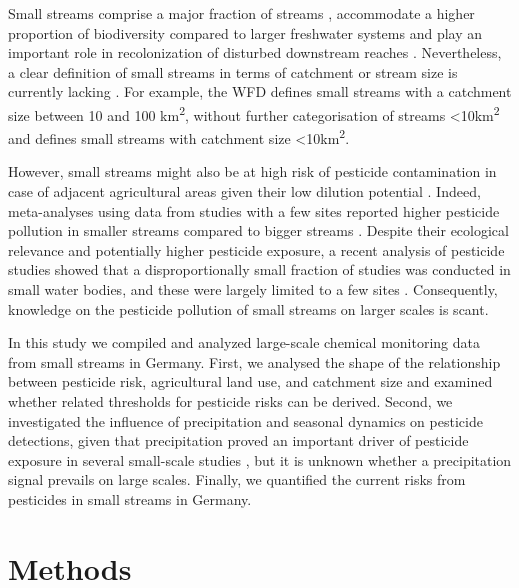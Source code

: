 \documentclass[journal=esthag,manuscript=article]{achemso}
\begin{document}
Small streams comprise a major fraction of streams \citep{nadeau_hydrological_2007}, accommodate a higher proportion of biodiversity compared to larger freshwater systems \citep{davies_comparison_2008, biggs_report_2014} and play an important role in recolonization of disturbed downstream reaches \citep{liess_analyzing_2005, orlinskiy_forested_2015}.
Nevertheless, a clear definition of small streams in terms of catchment or stream size is currently lacking \citep{lorenz_specifics_2016}. 
For example, the WFD defines small streams with a catchment size between 10 and 100 km\textsuperscript{2}, without further categorisation of streams \textless 10km\textsuperscript{2} and \citet{lorenz_specifics_2016} defines small streams with catchment size \textless 10km\textsuperscript{2}. 

However, small streams might also be at high risk of pesticide contamination in case of adjacent agricultural areas given their low dilution potential \citep{schulz_field_2004,liess_determination_1999}.
Indeed, meta-analyses using data from studies with a few sites reported higher pesticide pollution in smaller streams compared to bigger streams \citep{stehle_pesticide_2015,schulz_field_2004}. 
Despite their ecological relevance and potentially higher pesticide exposure, a recent analysis of pesticide studies showed that a disproportionally small fraction of studies was conducted in small water bodies, and these were largely limited to a few sites \citep{lorenz_specifics_2016}. 
Consequently, knowledge on the pesticide pollution of small streams on larger scales is scant.

In this study we compiled and analyzed large-scale chemical monitoring data from small streams in Germany. 
First, we analysed the shape of the relationship between pesticide risk, agricultural land use, and catchment size and examined whether related thresholds for pesticide risks can be derived. 
Second, we investigated the influence of precipitation and seasonal dynamics on pesticide detections, given that precipitation proved an important driver of pesticide exposure in several small-scale studies \citep{wittmer_significance_2010}\citep{schulz_field_2004}, but it is unknown whether a precipitation signal prevails on large scales. 
Finally, we quantified the current risks from pesticides in small streams in Germany.



\section{Methods}
\end{document}
